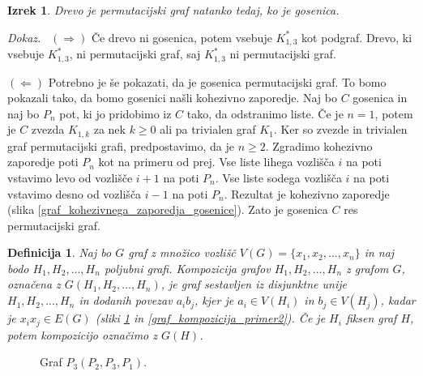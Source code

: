 \documentclass[a4paper, 12pt]{book}
\newtheorem{definicija}{Definicija}[chapter]
\newtheorem{izrek}{Izrek}[chapter]
\newenvironment{dokaz}{\emph{Dokaz.}\ }{\hspace{\fill}{$\Box$}}
\begin{document}
\begin{izrek}
\label{izrek_gosenica_permutacijski_graf}
    Drevo je permutacijski graf natanko tedaj, ko je gosenica.
\end{izrek}
\begin{dokaz}
    $(\Rightarrow)$ Če drevo ni gosenica, potem vsebuje $K_{1,3}^*$ kot podgraf. Drevo, ki vsebuje $K_{1,3}^*$, ni permutacijski graf, saj $K_{1,3}^*$ ni permutacijski graf. 
    
    $(\Leftarrow)$ Potrebno je še pokazati, da je gosenica permutacijski graf. To bomo pokazali tako, da bomo gosenici našli kohezivno zaporedje. Naj bo $C$ gosenica in naj bo $P_n$ pot, ki jo pridobimo iz $C$ tako, da odstranimo liste. Če je $n=1$, potem je $C$ zvezda $K_{1,k}$ za nek $k \geq 0$ ali pa trivialen graf $K_1$. Ker so zvezde in trivialen graf permutacijski grafi, predpostavimo, da je $n \geq 2$. Zgradimo kohezivno zaporedje poti $P_n$ kot na primeru od prej. Vse liste lihega vozlišča $i$ na poti vstavimo levo od vozlišče $i+1$ na poti $P_n$. Vse liste sodega vozlišča $i$ na poti vstavimo desno od vozlišča $i-1$ na poti $P_n$. Rezultat je kohezivno zaporedje (slika \ref{graf_kohezivnega_zaporedja_gosenice}). Zato je gosenica $C$ res permutacijski graf.    
\end{dokaz}

\begin{definicija}
    Naj bo $G$ graf z množico vozlišč $V(G) = \{x_1, x_2, ..., x_n\}$ in naj bodo $H_1, H_2, ..., H_n$ poljubni grafi. Kompozicija grafov $H_1, H_2, ..., H_n$ z grafom $G$, označena z $G(H_1, H_2, ..., H_n)$, je graf sestavljen iz disjunktne unije $H_1, H_2, ..., H_n$ in dodanih povezav $a_ib_j$, kjer je $a_i \in V(H_i)$ in $b_j \in V(H_j)$, kadar je $x_ix_j \in E(G)$ (sliki \ref{graf_kompozicija_primer1} in \ref{graf_kompozicija_primer2}). Če je $H_i$ fiksen graf $H$, potem kompozicijo označimo z $G(H)$. 
\end{definicija}

\begin{figure}[h]
    \begin{center}        
    \end{center}
    \caption{Graf $P_3(P_2, P_3, P_1)$.}
    \label{graf_kompozicija_primer1}
\end{figure}
\end{document}
